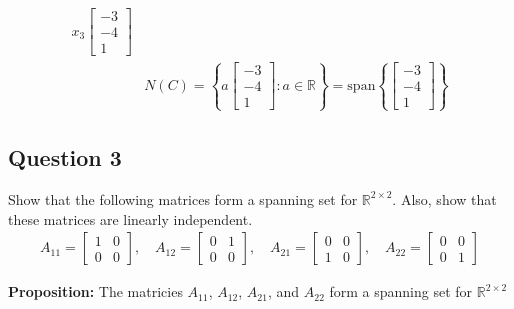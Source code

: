\documentclass{article}
\begin{document}
\begin{align*}
x_{3}\begin{bmatrix} -3 \\ -4 \\ 1 \end{bmatrix}
\\
&N(C) = \left\{a\begin{bmatrix} -3 \\ -4 \\ 1 \end{bmatrix} : a \in \mathbb{R}\right\} =
\text{span}\left\{\begin{bmatrix} -3 \\ -4 \\ 1 \end{bmatrix}\right\}
\end{align*}

\subsection*{Question 3}
Show that the following matrices form a spanning set for \(\mathbb{R}^{2 \times 2}\). Also, show that these matrices are linearly independent.
\begin{align*}
A_{11} = \begin{bmatrix} 1 & 0 \\ 0 & 0 \end{bmatrix}, \quad
A_{12} = \begin{bmatrix} 0 & 1 \\ 0 & 0 \end{bmatrix}, \quad
A_{21} = \begin{bmatrix} 0 & 0 \\ 1 & 0 \end{bmatrix}, \quad
A_{22} = \begin{bmatrix} 0 & 0 \\ 0 & 1 \end{bmatrix}
\end{align*}

\noindent
\textbf{Proposition:} The matricies $A_{11}$, $A_{12}$, $A_{21}$, and $A_{22}$ form a spanning set for $\mathbb{R}^{2 \times 2}$
\end{document}
